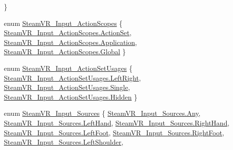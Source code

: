 \begin{DoxyCompactItemize}
 \}
\item 
enum \mbox{\hyperlink{namespace_valve_1_1_v_r_aecd07a81fe79a9f96c6787513e2d98e4}{Steam\+V\+R\+\_\+\+Input\+\_\+\+Action\+Scopes}} \{ \mbox{\hyperlink{namespace_valve_1_1_v_r_aecd07a81fe79a9f96c6787513e2d98e4a0e41fb0460743850261836ec194e4531}{Steam\+V\+R\+\_\+\+Input\+\_\+\+Action\+Scopes.\+Action\+Set}}, 
\mbox{\hyperlink{namespace_valve_1_1_v_r_aecd07a81fe79a9f96c6787513e2d98e4ae498749f3c42246d50b15c81c101d988}{Steam\+V\+R\+\_\+\+Input\+\_\+\+Action\+Scopes.\+Application}}, 
\mbox{\hyperlink{namespace_valve_1_1_v_r_aecd07a81fe79a9f96c6787513e2d98e4a4cc6684df7b4a92b1dec6fce3264fac8}{Steam\+V\+R\+\_\+\+Input\+\_\+\+Action\+Scopes.\+Global}}
 \}
\item 
enum \mbox{\hyperlink{namespace_valve_1_1_v_r_a03fc137e42935809cb498bd46107ca54}{Steam\+V\+R\+\_\+\+Input\+\_\+\+Action\+Set\+Usages}} \{ \mbox{\hyperlink{namespace_valve_1_1_v_r_a03fc137e42935809cb498bd46107ca54a955322c98b1fc571e8b6b688ae7d9ee4}{Steam\+V\+R\+\_\+\+Input\+\_\+\+Action\+Set\+Usages.\+Left\+Right}}, 
\mbox{\hyperlink{namespace_valve_1_1_v_r_a03fc137e42935809cb498bd46107ca54a66ba162102bbf6ae31b522aec561735e}{Steam\+V\+R\+\_\+\+Input\+\_\+\+Action\+Set\+Usages.\+Single}}, 
\mbox{\hyperlink{namespace_valve_1_1_v_r_a03fc137e42935809cb498bd46107ca54a7acdf85c69cc3c5305456a293524386e}{Steam\+V\+R\+\_\+\+Input\+\_\+\+Action\+Set\+Usages.\+Hidden}}
 \}
\item 
enum \mbox{\hyperlink{namespace_valve_1_1_v_r_a82e5bf501cc3aa155444ee3f0662853f}{Steam\+V\+R\+\_\+\+Input\+\_\+\+Sources}} \{ \newline
\mbox{\hyperlink{namespace_valve_1_1_v_r_a82e5bf501cc3aa155444ee3f0662853faed36a1ef76a59ee3f15180e0441188ad}{Steam\+V\+R\+\_\+\+Input\+\_\+\+Sources.\+Any}}, 
\mbox{\hyperlink{namespace_valve_1_1_v_r_a82e5bf501cc3aa155444ee3f0662853fa03f7bbbc02c9006ea393ec4ef5843d7b}{Steam\+V\+R\+\_\+\+Input\+\_\+\+Sources.\+Left\+Hand}}, 
\mbox{\hyperlink{namespace_valve_1_1_v_r_a82e5bf501cc3aa155444ee3f0662853faa51983e0f69f76a68e55efe2e7b700b5}{Steam\+V\+R\+\_\+\+Input\+\_\+\+Sources.\+Right\+Hand}}, 
\mbox{\hyperlink{namespace_valve_1_1_v_r_a82e5bf501cc3aa155444ee3f0662853fae81960506fa9c17a1fa39c529ae1bf50}{Steam\+V\+R\+\_\+\+Input\+\_\+\+Sources.\+Left\+Foot}}, 
\newline
\mbox{\hyperlink{namespace_valve_1_1_v_r_a82e5bf501cc3aa155444ee3f0662853fac901c64cc70540fbd6d7f6c71b047a6a}{Steam\+V\+R\+\_\+\+Input\+\_\+\+Sources.\+Right\+Foot}}, 
\mbox{\hyperlink{namespace_valve_1_1_v_r_a82e5bf501cc3aa155444ee3f0662853fa36131cbdc50218d923d0bcb0d9870e1c}{Steam\+V\+R\+\_\+\+Input\+\_\+\+Sources.\+Left\+Shoulder}}, 

\end{DoxyCompactItemize}
